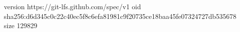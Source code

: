 version https://git-lfs.github.com/spec/v1
oid sha256:d6d345c0c22c40ec5f8c6efa81981c9f20735ce18baa45fe07324727db535678
size 129829

